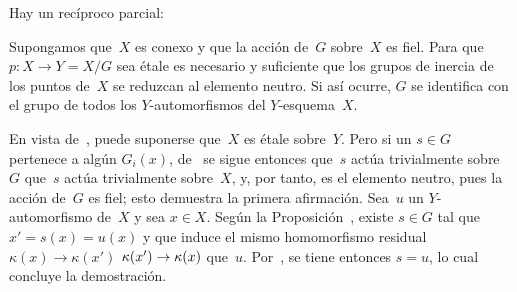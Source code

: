 Hay un recíproco parcial:

\begin{corollaire}
\label{V.2.4}
Supongamos que~$X$ es conexo y que la acción de~$G$ sobre~$X$ es fiel. Para
que $p\colon X\to Y=X/G$ sea étale es necesario y suficiente que los grupos
de inercia de los puntos de~$X$ se reduzcan al elemento neutro. Si así
ocurre, $G$ se identifica con el grupo de todos los $Y$-automorfismos del
$Y$-esquema~$X$.
\end{corollaire}

En vista de~, puede suponerse que~$X$ es étale sobre~$Y$. Pero si
un $s\in G$ pertenece a algún $G_i(x)$, de~ se sigue entonces
{que~$s$ actúa trivialmente sobre~$G$}
{que~$s$ actúa trivialmente sobre~$X$},
y, por tanto, es el elemento neutro, pues la acción de~$G$ es fiel; esto
demuestra la primera afirmación. Sea~$u$ un $Y$-automorfismo de~$X$ y sea
$x\in X$. Según la Proposición~, existe $s\in G$ tal que
$x'=s(x)=u(x)$ y que induce el mismo homomorfismo residual
{$\kappa(x)\to\kappa(x')$}
{$\kappa(x')\to\kappa(x)$}
que~$u$. Por~\loccit, se tiene entonces $s=u$, lo cual concluye la
demostración.
